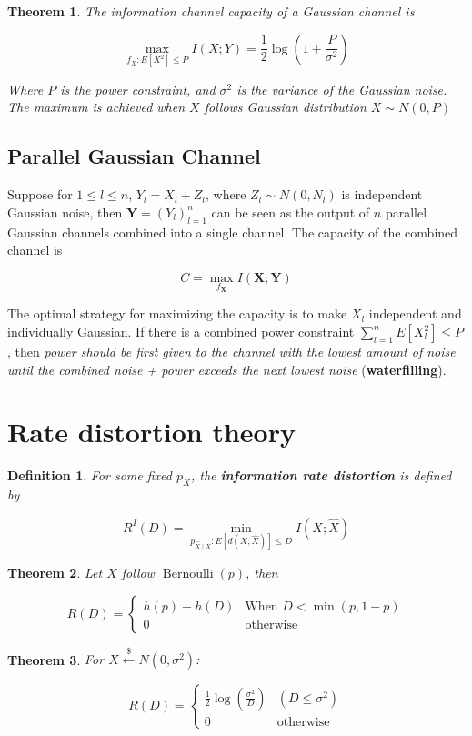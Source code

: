 \documentclass{article}
\newcommand{\leftsample}{\overset{{\scriptscriptstyle\$}}{\leftarrow}}
\newtheorem{definition}{Definition}[section]
\newtheorem{theorem}{Theorem}[section]
\begin{document}
\begin{theorem}
    The information channel capacity of a Gaussian channel is

    \begin{equation}
        \max_{f_X: E[X^2] \leq P} I(X; Y) = \frac{1}{2}\log{(1 + \frac{P}{\sigma^2})}
    \end{equation}

    Where $P$ is the power constraint, and $\sigma^2$ is the variance of the Gaussian noise. The maximum is achieved when $X$ follows Gaussian distribution $X \sim N(0, P)$
\end{theorem}

\subsection{Parallel Gaussian Channel}
Suppose for $1 \leq l \leq n$, $Y_l = X_l + Z_l$, where $Z_l \sim N(0, N_l)$ is independent Gaussian noise, then $\mathbf{Y} = (Y_l)_{l=1}^n$ can be seen as the output of $n$ parallel Gaussian channels combined into a single channel. The capacity of the combined channel is

\begin{equation*}
    C = \max_{f_\mathbf{X}}I(\mathbf{X}; \mathbf{Y})
\end{equation*}

The optimal strategy for maximizing the capacity is to make $X_l$ independent and individually Gaussian. If there is a combined power constraint $\sum_{l=1}^nE[X_l^2] \leq P$, then \textit{power should be first given to the channel with the lowest amount of noise until the combined noise + power exceeds the next lowest noise} (\textbf{waterfilling}).

\section{Rate distortion theory}
    \begin{definition}
        For some fixed $p_X$, the \textbf{information rate distortion} is defined by

        $$
        R^I(D) = \min_{p_{\hat{X} \mid X}: E[d(X, \hat{X})] \leq D} I(X; \hat{X})
        $$
    \end{definition}

    \begin{theorem}
        Let $X$ follow $\operatorname{Bernoulli}(p)$, then

        $$
        R(D) = \begin{cases}
            h(p) - h(D)  & \text{When $D < \min(p, 1-p)$} \\
            0   &  \text{otherwise}
        \end{cases}
    $$
    \end{theorem}

    \begin{theorem}
        For $X \leftsample N(0, \sigma^2)$:

        $$
        R(D) = \begin{cases}
            \frac{1}{2}\log(\frac{\sigma^2}{D}) & (D \leq \sigma^2) \\
            0 & \text{otherwise}
        \end{cases}
        $$
    \end{theorem}
\end{document}
